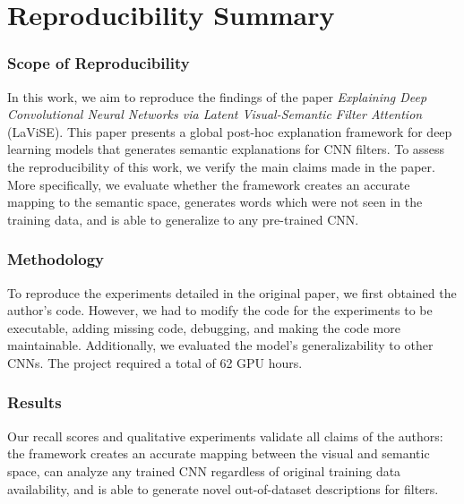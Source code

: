 \section*{\centering Reproducibility Summary}

\subsubsection*{Scope of Reproducibility}
In this work, we aim to reproduce the findings of the paper \textit{Explaining Deep Convolutional Neural Networks
via Latent Visual-Semantic Filter Attention} (LaViSE). This paper presents a global post-hoc explanation framework for deep learning models that generates semantic explanations for CNN filters. To assess the reproducibility of this work, we verify the main claims made in the paper. More specifically, we evaluate whether the framework creates an accurate mapping to the semantic space, generates words which were not seen in the training data, and is able to generalize to any pre-trained CNN.

\subsubsection*{Methodology}
To reproduce the experiments detailed in the original paper, we first obtained the author's code. However, we had to modify the code for the experiments to be executable, adding missing code, debugging, and making the code more maintainable. Additionally, we evaluated the model's generalizability to other CNNs. The project required a total of 62 GPU hours.

\subsubsection*{Results}
Our recall scores and qualitative experiments validate all claims of the authors: the framework creates an accurate mapping between the visual and semantic space, can analyze any trained CNN regardless of original training data availability, and is able to generate novel out-of-dataset descriptions for filters.

